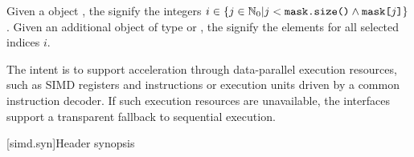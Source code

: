 \pnum
Given a  object ,
the  signify the integers $i \in \{j \in \mathbb{N}_0 | j < \texttt{mask.size()} \wedge \texttt{mask[}j\texttt{]}\}$.
Given an additional object  of type  or ,
the  signify the elements  for all selected indices $i$.

\pnum
\begin{note}
The intent is to support acceleration through data-parallel execution resources, such as SIMD registers and instructions or execution units driven by a common instruction decoder. If such execution resources are unavailable, the interfaces support a transparent fallback to sequential execution.
\end{note}

[simd.syn]{Header \texorpdfstring{}{<simd>} synopsis}

